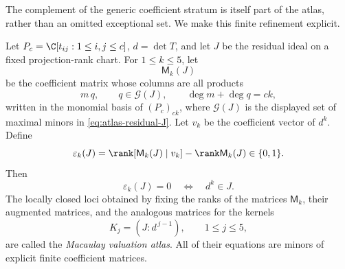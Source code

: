 The complement of the generic coefficient stratum is itself part of
the atlas, rather than an omitted exceptional set.  We make this
finite refinement explicit.

\begin{definition}
\label{def:macaulay-atlas}
Let \(P_c=\C[t_{ij}:1\le i,j\le c]\), \(d=\det T\), and let \(J\)
be the residual ideal on a fixed projection-rank chart.  For
\(1\le k\le5\), let
\[
 \mathsf M_k(J)
\]
be the coefficient matrix whose columns are all products
\[
 m\,q,\qquad
 q\in\mathcal G(J),\qquad
 \deg m+\deg q=ck,
\]
written in the monomial basis of \((P_c)_{ck}\), where
\(\mathcal G(J)\) is the displayed set of maximal minors in
\eqref{eq:atlas-residual-J}.  Let \(v_k\) be the coefficient vector
of \(d^k\).  Define
\[
 \varepsilon_k(J)=
 \rank[\mathsf M_k(J)\mid v_k]-\rank\mathsf M_k(J)\in\{0,1\}.
\]
Then
\[
 \varepsilon_k(J)=0\quad\Longleftrightarrow\quad d^k\in J.
\]
The locally closed loci obtained by fixing the ranks of the matrices
\(\mathsf M_k\), their augmented matrices, and the analogous matrices
for the kernels
\[
 K_j=(J:d^{\,j-1}),\qquad1\le j\le5,
\]
are called the \emph{Macaulay valuation atlas}.  All of their
equations are minors of explicit finite coefficient matrices.
\end{definition}


